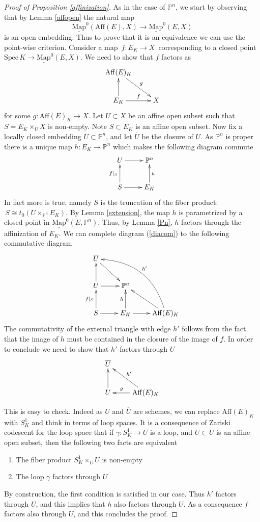 \documentclass[11pt,letterpaper]{amsart}
\newcommand{\bP}{\mathbb{P}}
\newcommand{\Mapo}[2]{\underline{\mathrm{Map}}^{0}\left (#1,#2\right )}
\newcommand{\Spec}{\mathrm{S}\mathrm{pec}\,}
\begin{document}
  
 \begin{proof}[Proof of Proposition \ref{affinization}]
As in the case of $\bP^n$, we start by observing that by Lemma \ref{affopen} the natural map
 $$
\Mapo{\mathrm{Aff}(E)}{X} \to \Mapo{E}{X}
$$
 is an open embedding. Thus to prove that it is an equivalence we can use the point-wise criterion. Consider a map 
 $ \, 
 f: E_K \to X
 \, $ 
corresponding to a closed point $\Spec K\to\Mapo{E}{X}$. We need to show that $f$ factors as 
$$
\xymatrix{\mathrm{Aff}(E)_K \ar[dr]^-{g} & \\
E_K \ar[u] \ar[r]^-f & X }
$$
for some $g: \mathrm{Aff}(E)_K \to X$. Let $U \subset X$ be an affine open subset such that 
$S=E_K \times_U X$ is non-empty. Note $S \subset E_K$ is an affine open subset. Now fix a locally closed embedding $U \subset \mathbb{P}^n$, and let $\overline{U}$ be the closure of $U$. As $\mathbb{P}^n$ is proper there is a unique map $h: E_K \to \mathbb{P}^n$ which makes the following diagram commute
\begin{equation}
\label{diacom}
\begin{gathered}
\xymatrix{
U \ar[r] & \mathbb{P}^n \\
S \ar[r] \ar[u]^-{f|_S} & E_K \ar[u]_-h
}
\end{gathered}
\end{equation}
In fact more is true, namely $S$ is the truncation of the fiber product: 
$ \, 
S \cong t_0(U \times_{\bP^n} E_K)
$. 
By Lemma \ref{extension}, the map $h$ is parametrized by a closed point in 
$\Mapo{E}{\bP^n}$. Thus, by  Lemma \ref{Pn}, $h$ factors through the affinization of $E_K$. We can complete diagram (\ref{diacom}) to the following commutative diagram
$$
\xymatrix{
\overline{U} \ar[dr] & & \\
U \ar[r] \ar[u] & \mathbb{P}^n & \\
S \ar[r] \ar[u]^-{f|_S} & E_K \ar[u]^-h \ar[r] & \mathrm{Aff}(E)_K \ar[ul] \ar@/_2pc/[uull]_-{h'}
}
$$
The commutativity of the external  triangle with edge $h'$ follows  from the fact that the image of $h$  must be contained in the closure of the image of $f$. In order to conclude we need to show that $h'$ factors through $U$
$$
\xymatrix{
\overline{U}  & \\
U  \ar[u] &  \mathrm{Aff}(E)_K \ar[ul]_-{h'} \ar[l]_-{g}
}
$$

This is easy to check. Indeed as $U$ and $\overline{U}$ are schemes, we can replace  $\mathrm{Aff}(E)_K$ with $S^1_K$ and think in terms of loop spaces. It is a consequence of Zariski codescent for the loop space that if $\gamma: S^1_K \to \overline{U}$ is a loop, and $U \subset \overline{U}$ is an affine open subset, then the following two facts are equivalent
\begin{enumerate} 
\item The fiber product $S^1_K \times_{\overline{U}}U$ is non-empty 
\item The loop $\gamma$ factors through $U$
\end{enumerate}
By construction, the first condition is satisfied in our case. Thus $h'$ factors through $U$, and this implies that $h$ also factors through $U$. As a consequence $f$   factors also through $U$, and this concludes the proof.
\end{proof}
 
\end{document}
